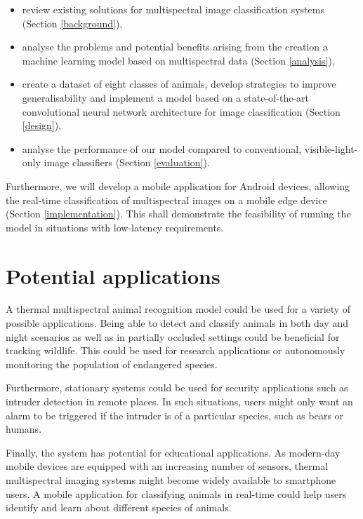 \documentclass{l4proj}
\begin{document}
\begin{itemize}
  \item review existing solutions for multispectral image classification systems (Section \ref{background}),
  \item analyse the problems and potential benefits arising from the creation a machine learning model based on multispectral data (Section \ref{analysis}),
  \item create a dataset of eight classes of animals, develop strategies to improve generalisability and implement a model based on a state-of-the-art convolutional neural network architecture for image classification (Section \ref{design}),
  \item analyse the performance of our model compared to conventional, visible-light-only image classifiers (Section \ref{evaluation}).
\end{itemize}

Furthermore, we will develop a mobile application for Android devices, allowing the real-time classification of multispectral images on a mobile edge device (Section \ref{implementation}). This shall demonstrate the feasibility of running the model in situations with low-latency requirements.


\section{Potential applications}

A thermal multispectral animal recognition model could be used for a variety of possible applications. Being able to detect and classify animals in both day and night scenarios as well as in partially occluded settings could be beneficial for tracking wildlife. This could be used for research applications or autonomously monitoring the population of endangered species.

Furthermore, stationary systems could be used for security applications such as intruder detection in remote places. In such situations, users might only want an alarm to be triggered if the intruder is of a particular species, such as bears or humans.

Finally, the system has potential for educational applications. As modern-day mobile devices are equipped with an increasing number of sensors, thermal multispectral imaging systems might become widely available to smartphone users. A mobile application for classifying animals in real-time could help users identify and learn about different species of animals.
\end{document}
